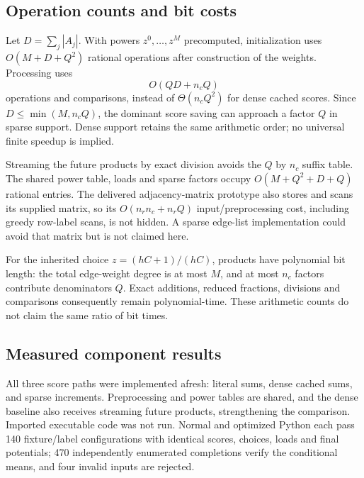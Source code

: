 \subsection{Operation counts and bit costs}
Let $D=\sum_j|A_j|$. With powers $z^0,\ldots,z^M$ precomputed, initialization uses $O(M+D+Q^2)$ rational operations after construction of the weights. Processing uses
\[
 O(QD+n_cQ)
\]
operations and comparisons, instead of $\Theta(n_cQ^2)$ for dense cached scores. Since $D\le\min(M,n_cQ)$, the dominant score saving can approach a factor $Q$ in sparse support. Dense support retains the same arithmetic order; no universal finite speedup is implied.

Streaming the future products by exact division avoids the $Q$ by $n_c$ suffix table. The shared power table, loads and sparse factors occupy $O(M+Q^2+D+Q)$ rational entries. The delivered adjacency-matrix prototype also stores and scans its supplied matrix, so its $O(n_rn_c+n_rQ)$ input/preprocessing cost, including greedy row-label scans, is not hidden. A sparse edge-list implementation could avoid that matrix but is not claimed here.

For the inherited choice $z=(hC+1)/(hC)$, products have polynomial bit length: the total edge-weight degree is at most $M$, and at most $n_c$ factors contribute denominators $Q$. Exact additions, reduced fractions, divisions and comparisons consequently remain polynomial-time. These arithmetic counts do not claim the same ratio of bit times.

\subsection{Measured component results}
All three score paths were implemented afresh: literal sums, dense cached sums, and sparse increments. Preprocessing and power tables are shared, and the dense baseline also receives streaming future products, strengthening the comparison. Imported executable code was not run. Normal and optimized Python each pass 140 fixture/label configurations with identical scores, choices, loads and final potentials; 470 independently enumerated completions verify the conditional means, and four invalid inputs are rejected.

